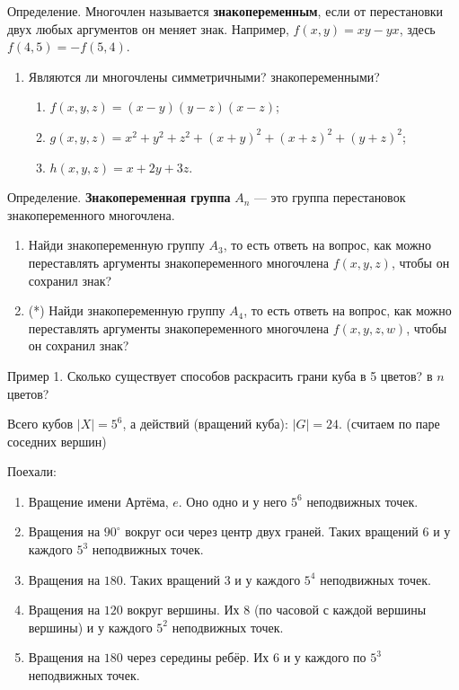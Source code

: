 \documentclass[12pt]{article} %
\begin{document}
Определение. Многочлен называется \textbf{знакопеременным}, если от перестановки двух любых аргументов он меняет знак. Например, $f(x,y)=xy-yx$, здесь $f(4,5)= - f(5,4)$.

\begin{enumerate}[resume]
\item Являются ли многочлены симметричными? знакопеременными?
\begin{enumerate}
\item $f(x, y, z) = (x-y)(y-z)(x-z)$;
\item $g(x, y, z) = x^2 + y^2 + z^2 + (x+y)^2 + (x+z)^2 + (y+z)^2$;
\item $h(x, y, z) = x +2y + 3z$.
\end{enumerate}
\end{enumerate}


Определение. \textbf{Знакопеременная группа} $A_n$ — это группа перестановок знакопеременного многочлена.

\begin{enumerate}[resume]
\item Найди знакопеременную группу $A_3$, то есть ответь на вопрос, как можно переставлять аргументы знакопеременного многочлена $f(x,y,z)$, чтобы он сохранил знак?
\item (*) Найди знакопеременную группу $A_4$, то есть ответь на вопрос, как можно переставлять аргументы знакопеременного многочлена $f(x,y,z,w)$, чтобы он сохранил знак?
\end{enumerate}


\newpage

Пример 1. Сколько существует способов раскрасить грани куба в 5 цветов? в $n$ цветов?

Всего кубов $|X|=5^6$, а действий (вращений куба): $|G|=24$. (считаем по паре соседних вершин)

Поехали:
\begin{enumerate}
\item Вращение имени Артёма, $e$. Оно одно и у него $5^6$ неподвижных точек.
\item Вращения на $90^{\circ}$ вокруг оси через центр двух граней. Таких вращений $6$ и у каждого $5^3$ неподвижных точек.
\item Вращения на $180$. Таких вращений 3 и у каждого $5^4$ неподвижных точек.
\item Вращения на $120$ вокруг вершины. Их 8 (по часовой с каждой вершины вершины) и у каждого $5^2$ неподвижных точек.
\item Вращения на $180$ через середины ребёр. Их 6 и у каждого по $5^3$ неподвижных точек.
\end{enumerate}
\end{document}
